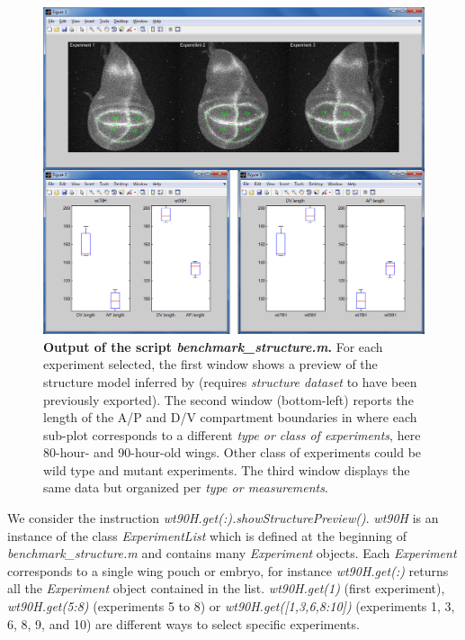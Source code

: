 \begin{figure}[!h]
\centering
\includegraphics[scale=0.35]{images/matlab_structure.jpg}
\caption{\textbf{Output of the \wingj \matlab script \textit{benchmark\_structure.m}.} For each experiment selected, the first window shows a preview of the structure model inferred by \wingj (requires \textit{structure dataset} to have been previously exported). The second window (bottom-left) reports the length of the A/P and D/V compartment boundaries in \mum where each sub-plot corresponds to a different \emph{type or class of experiments}, here 80-hour- and 90-hour-old wings. Other class of experiments could be wild type and mutant experiments. The third window displays the same data but organized per \emph{type or measurements}.}
\label{fig:matlab_structure}
\end{figure}

We consider the instruction \textit{wt90H.get(:).showStructurePreview()}. \textit{wt90H} is an instance of the \matlab class \textit{ExperimentList} which is defined at the beginning of \textit{benchmark\_structure.m} and contains many \textit{Experiment} objects. Each \textit{Experiment} corresponds to a single wing pouch or embryo, for instance \textit{wt90H.get(:)} returns all the \textit{Experiment} object contained in the list. 
\textit{wt90H.get(1)} (first experiment), \textit{wt90H.get(5:8)} (experiments 5 to 8) or \textit{wt90H.get([1,3,6,8:10])} (experiments 1, 3, 6, 8, 9, and 10) are different ways to select specific experiments.\\

